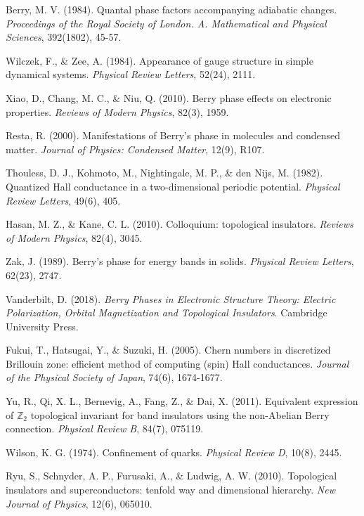 \documentclass[12pt,a4paper]{article}
\begin{document}
\begin{thebibliography}{12}

 Berry, M. V. (1984). Quantal phase factors accompanying adiabatic changes. \textit{Proceedings of the Royal Society of London. A. Mathematical and Physical Sciences}, 392(1802), 45-57.

 Wilczek, F., \& Zee, A. (1984). Appearance of gauge structure in simple dynamical systems. \textit{Physical Review Letters}, 52(24), 2111.

 Xiao, D., Chang, M. C., \& Niu, Q. (2010). Berry phase effects on electronic properties. \textit{Reviews of Modern Physics}, 82(3), 1959.

 Resta, R. (2000). Manifestations of Berry's phase in molecules and condensed matter. \textit{Journal of Physics: Condensed Matter}, 12(9), R107.

 Thouless, D. J., Kohmoto, M., Nightingale, M. P., \& den Nijs, M. (1982). Quantized Hall conductance in a two-dimensional periodic potential. \textit{Physical Review Letters}, 49(6), 405.

 Hasan, M. Z., \& Kane, C. L. (2010). Colloquium: topological insulators. \textit{Reviews of Modern Physics}, 82(4), 3045.

 Zak, J. (1989). Berry's phase for energy bands in solids. \textit{Physical Review Letters}, 62(23), 2747.

 Vanderbilt, D. (2018). \textit{Berry Phases in Electronic Structure Theory: Electric Polarization, Orbital Magnetization and Topological Insulators}. Cambridge University Press.

 Fukui, T., Hatsugai, Y., \& Suzuki, H. (2005). Chern numbers in discretized Brillouin zone: efficient method of computing (spin) Hall conductances. \textit{Journal of the Physical Society of Japan}, 74(6), 1674-1677.

 Yu, R., Qi, X. L., Bernevig, A., Fang, Z., \& Dai, X. (2011). Equivalent expression of $\mathbb{Z}_2$ topological invariant for band insulators using the non-Abelian Berry connection. \textit{Physical Review B}, 84(7), 075119.

 Wilson, K. G. (1974). Confinement of quarks. \textit{Physical Review D}, 10(8), 2445.

 Ryu, S., Schnyder, A. P., Furusaki, A., \& Ludwig, A. W. (2010). Topological insulators and superconductors: tenfold way and dimensional hierarchy. \textit{New Journal of Physics}, 12(6), 065010.

\end{thebibliography}
\end{document}
